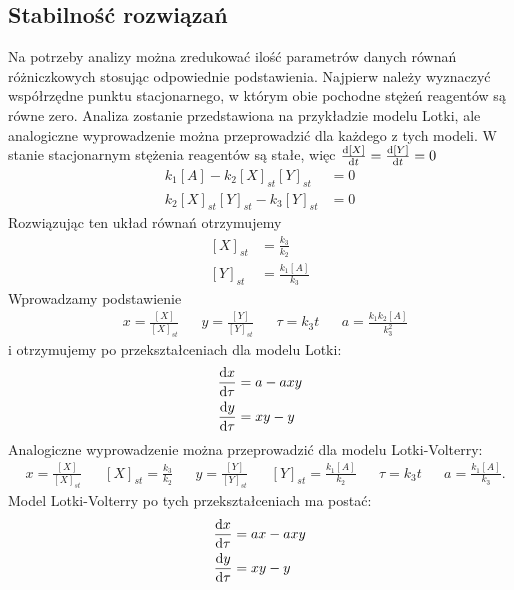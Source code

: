 \documentclass[10pt, a4paper, twoside, onecolumn]{article}
\numberwithin{equation}{section}
\begin{document}
	\subsection{Stabilność rozwiązań}
	Na potrzeby analizy można zredukować ilość parametrów danych równań różniczkowych stosując odpowiednie podstawienia. Najpierw należy wyznaczyć współrzędne punktu stacjonarnego, w którym obie pochodne stężeń reagentów są równe zero. Analiza zostanie przedstawiona na przykładzie modelu Lotki, ale analogiczne wyprowadzenie można przeprowadzić dla każdego z tych modeli. W stanie stacjonarnym stężenia reagentów są stałe, więc \(\dv{[X]}{t}=\dv{[Y]}{t}=0\)
	\begin{equation}\label{lotka_pods}
	\begin{split}
		k_{1}[A]-k_{2}[X]_{st}[Y]_{st} &= 0 \\
		k_{2}[X]_{st}[Y]_{st}-k_{3}[Y]_{st} &= 0
	\end{split}
	\end{equation}
	Rozwiązując ten układ równań otrzymujemy
	\begin{equation}\label{lotka_stac}
	\begin{split}
		[X]_{st} &= \frac{k_{3}}{k_{2}} \\
		[Y]_{st} &= \frac{k_{1}[A]}{k_{3}}
	\end{split}
	\end{equation}
	Wprowadzamy podstawienie
	\begin{align*}
		& x=\frac{[X]}{[X]_{st}} && y=\frac{[Y]}{[Y]_{st}} && \tau=k_{3}t && a=\frac{k_{1}k_{2}[A]}{k_{3}^{2}}
	\end{align*}
	i otrzymujemy po przekształceniach dla modelu Lotki:
	\begin{equation}\label{lotka_prosty}
	\begin{split}
		\dv{x}{\tau} &= a-axy \\
		\dv{y}{\tau} &= xy-y
	\end{split}
	\end{equation}
	Analogiczne wyprowadzenie można przeprowadzić dla modelu Lotki-Volterry:
	\begin{align}\label{lotka_volterra_stac}
		& x=\frac{[X]}{[X]_{st}} && [X]_{st} = \frac{k_{3}}{k_{2}} && y=\frac{[Y]}{[Y]_{st}} && [Y]_{st} = \frac{k_{1}[A]}{k_{2}} && \tau=k_{3}t && a=\frac{k_{1}[A]}{k_{3}}.
	\end{align}
	Model Lotki-Volterry po tych przekształceniach ma postać: 
	\begin{equation}\label{lotka_volterra_prosty}
	\begin{split}
		\dv{x}{\tau} &= ax-axy \\
		\dv{y}{\tau} &= xy-y
	\end{split}
	\end{equation}
\end{document}
